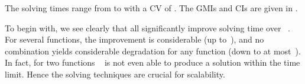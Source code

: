 %
The solving times range from
\printMinSolvingTime{
  \SolvTechEnableOnlyAllGoodPrePlusSolvingTimeSpeedupNonePrePlusSolvingTimeAvgMin,
  \SolvTechEnableOnlyAllGoodPrePlusSolvingTimeSpeedupPrePlusSolvingTimeAvgMin,
  \SolvTechDisableAllBadPrePlusSolvingTimeSpeedupPrePlusSolvingTimeAvgMin,
  \SolvTechDisableAllPrePlusSolvingTimeSpeedupPrePlusSolvingTimeAvgMin
} to
\printMaxSolvingTime{
  \SolvTechEnableOnlyAllGoodPrePlusSolvingTimeSpeedupNonePrePlusSolvingTimeAvgMax,
  \SolvTechEnableOnlyAllGoodPrePlusSolvingTimeSpeedupPrePlusSolvingTimeAvgMax,
  \SolvTechDisableAllBadPrePlusSolvingTimeSpeedupPrePlusSolvingTimeAvgMax,
  \SolvTechDisableAllPrePlusSolvingTimeSpeedupPrePlusSolvingTimeAvgMax
} with a \gls{CV} of
\numMaxOf{
  \SolvTechEnableOnlyAllGoodPrePlusSolvingTimeSpeedupNonePrePlusSolvingTimeCvMax,
  \SolvTechEnableOnlyAllGoodPrePlusSolvingTimeSpeedupPrePlusSolvingTimeCvMax,
  \SolvTechDisableAllBadPrePlusSolvingTimeSpeedupPrePlusSolvingTimeCvMax,
  \SolvTechDisableAllPrePlusSolvingTimeSpeedupPrePlusSolvingTimeCvMax
}.
%
The \glspl{GMI} and \glspl{CI} are given in
.

To begin with, we see clearly that all 
significantly improve solving time over ~.
%
For several \glspl{function}, the improvement is considerable (up
to~\printMaxZCNorm{%
  \SolvTechEnableOnlyAllGoodPrePlusSolvingTimeSpeedupPrePlusSolvingTimeZeroCenteredSpeedupMax,
  \SolvTechDisableAllBadPrePlusSolvingTimeSpeedupPrePlusSolvingTimeZeroCenteredSpeedupMax,
  \SolvTechDisableAllPrePlusSolvingTimeSpeedupPrePlusSolvingTimeZeroCenteredSpeedupMax
}), and no combination yields considerable degradation for any \gls{function}
(down
to at most~\printMinSpeedup{%
  \SolvTechEnableOnlyAllGoodPrePlusSolvingTimeSpeedupPrePlusSolvingTimeZeroCenteredSpeedupMin,
  \SolvTechDisableAllBadPrePlusSolvingTimeSpeedupPrePlusSolvingTimeZeroCenteredSpeedupMin,
  \SolvTechDisableAllPrePlusSolvingTimeSpeedupPrePlusSolvingTimeZeroCenteredSpeedupMin
}).
%
In fact, for two \glspl{function} ~ is not even able to produce a \gls{solution}
within the time limit.
%
Hence the solving techniques are crucial for scalability.

